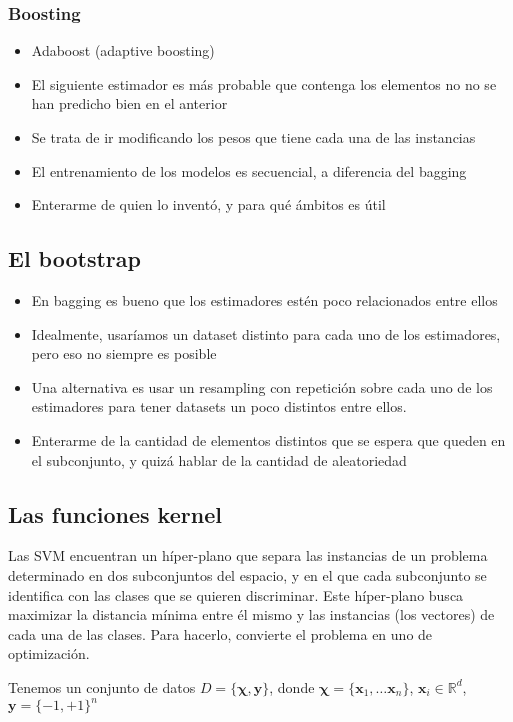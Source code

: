\documentclass{article}
\newcommand{\reals}{\mathds{R}}
\begin{document}
\subsubsection{Boosting}
\begin{itemize}
 \item Adaboost (adaptive boosting)
 \item El siguiente estimador es más probable que contenga los elementos no
       no se han predicho bien en el anterior
 \item Se trata de ir modificando los pesos que tiene cada una de las instancias
 \item El entrenamiento de los modelos es secuencial, a diferencia del bagging
 \item Enterarme de quien lo inventó, y para qué ámbitos es útil
\end{itemize}
\subsection{El bootstrap}
\begin{itemize}
 \item En bagging es bueno que los estimadores estén poco relacionados
       entre ellos
 \item Idealmente, usaríamos un dataset distinto para cada uno de los
       estimadores, pero eso no siempre es posible
 \item Una alternativa es usar un resampling con repetición sobre cada
       uno de los estimadores para tener datasets un poco distintos entre ellos.
 \item Enterarme de la cantidad de elementos distintos que se espera que queden
       en el subconjunto, y quizá hablar de la cantidad de aleatoriedad
\end{itemize}
\subsection{Las funciones kernel}
Las SVM encuentran un híper-plano que separa las instancias de un problema
determinado en dos subconjuntos del espacio, y en el que cada subconjunto se
identifica con las clases que se quieren discriminar. Este híper-plano
busca maximizar la distancia mínima entre él mismo y las instancias (los vectores)
de cada una de las clases. Para hacerlo, convierte el problema en uno de
optimización.

Tenemos un conjunto de datos $D = \{\bm{\chi}, \bm{y}\}$, donde $\bm{\chi} = \{\bm{x}_1, \ldots \bm{x}_n\}$, $\bm{x}_i \in \reals^d$, $\bm{y} = \{-1, +1\}^n$
\end{document}
